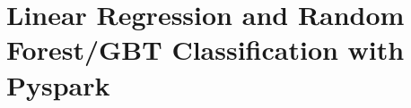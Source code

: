 \documentclass[letterpaper,10pt,english]{sphinxmanual}
\begin{document}
\chapter{Linear Regression and Random Forest/GBT Classification with Pyspark}
\label{\detokenize{2020-08-22-Linear Regression and Random Forest_GBT Classification with Pyspark:linear-regression-and-random-forest-gbt-classification-with-pyspark}}\label{\detokenize{2020-08-22-Linear Regression and Random Forest_GBT Classification with Pyspark::doc}}
\begin{sphinxVerbatim}[commandchars=\\\{\}]
   
     
   


\end{sphinxVerbatim}
\end{document}
